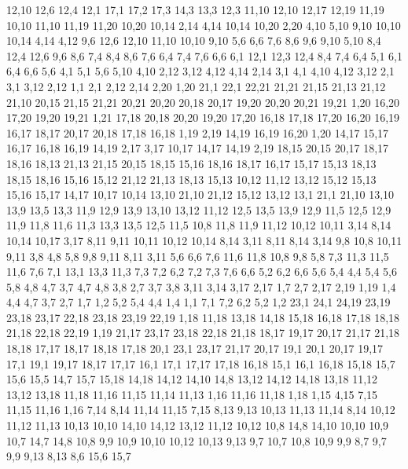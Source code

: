 12,10
12,6
12,4
%
12,1
17,1
17,2
17,3
14,3
13,3
12,3
%
11,10
12,10
12,17
12,19
11,19
%
10,10
11,10
11,19
11,20
10,20
10,14
%
2,14
4,14
10,14
10,20
2,20
%
4,10
5,10
9,10
10,10
10,14
4,14
4,12
%
9,6
12,6
12,10
11,10
10,10
9,10
%
5,6
6,6
7,6
8,6
9,6
9,10
5,10
%
8,4
12,4
12,6
9,6
8,6
%
7,4
8,4
8,6
7,6
%
6,4
7,4
7,6
6,6
%
6,1
12,1
12,3
12,4
8,4
7,4
6,4
%
5,1
6,1
6,4
6,6
5,6
%
4,1
5,1
5,6
5,10
4,10
%
2,12
3,12
4,12
4,14
2,14
%
3,1
4,1
4,10
4,12
3,12
%
2,1
3,1
3,12
2,12
%
1,1
2,1
2,12
2,14
2,20
1,20
21,1
22,1
22,21
21,21
21,15
21,13
21,12
21,10
%
20,15
21,15
21,21
20,21
20,20
20,18
20,17
%
19,20
20,20
20,21
19,21
%
1,20
16,20
17,20
19,20
19,21
1,21
%
17,18
20,18
20,20
19,20
17,20
%
16,18
17,18
17,20
16,20
16,19
%
16,17
18,17
20,17
20,18
17,18
16,18
%
1,19
2,19
14,19
16,19
16,20
1,20
%
14,17
15,17
16,17
16,18
16,19
14,19
%
2,17
3,17
10,17
14,17
14,19
2,19
%
18,15
20,15
20,17
18,17
18,16
%
18,13
21,13
21,15
20,15
18,15
%
15,16
18,16
18,17
16,17
15,17
%
15,13
18,13
18,15
18,16
15,16
%
15,12
21,12
21,13
18,13
15,13
%
10,12
11,12
13,12
15,12
15,13
15,16
15,17
14,17
10,17
10,14
%
13,10
21,10
21,12
15,12
13,12
%
13,1
21,1
21,10
13,10
13,9
13,5
13,3
%
11,9
12,9
13,9
13,10
13,12
11,12
%
12,5
13,5
13,9
12,9
%
11,5
12,5
12,9
11,9
11,8
11,6
%
11,3
13,3
13,5
12,5
11,5
%
10,8
11,8
11,9
11,12
10,12
10,11
%
3,14
8,14
10,14
10,17
3,17
%
8,11
9,11
10,11
10,12
10,14
8,14
%
3,11
8,11
8,14
3,14
%
9,8
10,8
10,11
9,11
%
3,8
4,8
5,8
9,8
9,11
8,11
3,11
%
5,6
6,6
7,6
11,6
11,8
10,8
9,8
5,8
%
7,3
11,3
11,5
11,6
7,6
%
7,1
13,1
13,3
11,3
7,3
7,2
%
6,2
7,2
7,3
7,6
6,6
%
5,2
6,2
6,6
5,6
5,4
%
4,4
5,4
5,6
5,8
4,8
4,7
%
3,7
4,7
4,8
3,8
%
2,7
3,7
3,8
3,11
3,14
3,17
2,17
%
1,7
2,7
2,17
2,19
1,19
%
1,4
4,4
4,7
3,7
2,7
1,7
%
1,2
5,2
5,4
4,4
1,4
%
1,1
7,1
7,2
6,2
5,2
1,2
23,1
24,1
24,19
23,19
23,18
23,17
%
22,18
23,18
23,19
22,19
%
1,18
11,18
13,18
14,18
15,18
16,18
17,18
18,18
21,18
22,18
22,19
1,19
%
21,17
23,17
23,18
22,18
21,18
%
18,17
19,17
20,17
21,17
21,18
18,18
%
17,17
18,17
18,18
17,18
%
20,1
23,1
23,17
21,17
20,17
%
19,1
20,1
20,17
19,17
%
17,1
19,1
19,17
18,17
17,17
%
16,1
17,1
17,17
17,18
16,18
%
15,1
16,1
16,18
15,18
15,7
15,6
15,5
%
14,7
15,7
15,18
14,18
14,12
14,10
14,8
%
13,12
14,12
14,18
13,18
%
11,12
13,12
13,18
11,18
11,16
11,15
11,14
11,13
%
1,16
11,16
11,18
1,18
%
1,15
4,15
7,15
11,15
11,16
1,16
%
7,14
8,14
11,14
11,15
7,15
%
8,13
9,13
10,13
11,13
11,14
8,14
%
10,12
11,12
11,13
10,13
%
10,10
14,10
14,12
13,12
11,12
10,12
%
10,8
14,8
14,10
10,10
10,9
%
10,7
14,7
14,8
10,8
%
9,9
10,9
10,10
10,12
10,13
9,13
%
9,7
10,7
10,8
10,9
9,9
%
8,7
9,7
9,9
9,13
8,13
%
8,6
15,6
15,7
